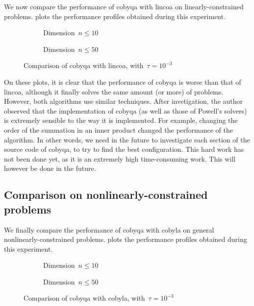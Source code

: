 We now compare the performance of \gls{cobyqa} with \gls{lincoa} on linearly-constrained problems.
 plots the performance profiles obtained during this experiment.

\begin{figure}[ht]
    \centering
    \begin{subfigure}[b]{0.49\textwidth}
        \centering
        \caption{Dimension~$n \le 10$}
    \end{subfigure}
    \hfill
    \begin{subfigure}[b]{0.49\textwidth}
        \centering
        \caption{Dimension~$n \le 50$}
    \end{subfigure}
    \caption{Comparison of \gls{cobyqa} with \gls{lincoa}, with~$\tau = 10^{-3}$}
    \label{fig:cobyqa-lincoa-linearly-constrained}
\end{figure}

On these plots, it is clear that the performance of \gls{cobyqa} is worse than that of \gls{lincoa}, although it finally solves the same amount (or more) of problems.
However, both algorithms use similar techniques.
After invetigation, the author observed that the implementation of \gls{cobyqa} (as well as those of Powell's solvers) is extremely sensible to the way it is implemented.
For example, changing the order of the summation in an inner product changed the performance of the algorithm.
In other words, we need in the future to investigate each section of the source code of \gls{cobyqa}, to try to find the best configuration.
This hard work has not been done yet, as it is an extremely high time-consuming work.
This will however be done in the future.

\subsection{Comparison on nonlinearly-constrained problems}

We finally compare the performance of \gls{cobyqa} with \gls{cobyla} on general nonlinearly-constrained problems.
 plots the performance profiles obtained during this experiment.

\begin{figure}[ht]
    \centering
    \begin{subfigure}[b]{0.49\textwidth}
        \centering
        \caption{Dimension~$n \le 10$}
    \end{subfigure}
    \hfill
    \begin{subfigure}[b]{0.49\textwidth}
        \centering
        \caption{Dimension~$n \le 50$}
    \end{subfigure}
    \caption{Comparison of \gls{cobyqa} with \gls{cobyla}, with~$\tau = 10^{-3}$}
    \label{fig:cobyqa-cobyla-nonlinearly-constrained}
\end{figure}

